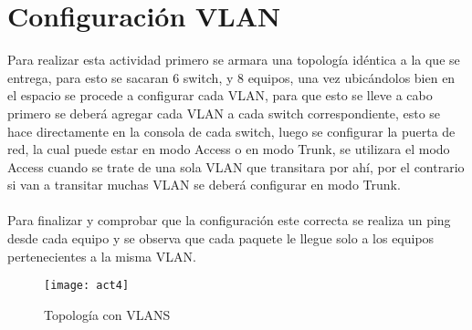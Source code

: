 \documentclass{udpreport}
\begin{document}
	\section{Configuración VLAN}
	    Para realizar esta actividad primero se armara una topología idéntica a la que se entrega, para esto se sacaran 6 switch, y 8 equipos, una vez ubicándolos bien en el espacio se procede a configurar cada VLAN, para que esto se lleve a cabo primero se deberá agregar cada VLAN a cada switch correspondiente, esto se hace directamente en la consola de cada switch, luego se configurar la puerta de red, la cual puede estar en modo Access o en modo Trunk, se utilizara el modo Access cuando se trate de una sola VLAN que transitara por ahí, por el contrario si van a transitar muchas VLAN se deberá configurar en modo Trunk.\\\\
    Para finalizar y comprobar que la configuración este correcta se realiza un ping desde cada equipo y se observa que cada
	paquete le llegue solo a los equipos pertenecientes a la misma VLAN.\\
	
	\begin{figure}[H]
	\centering
	\texttt{[image: act4]}
	\caption{Topología con VLANS}
	\end{figure}\\	
	
\end{document}
